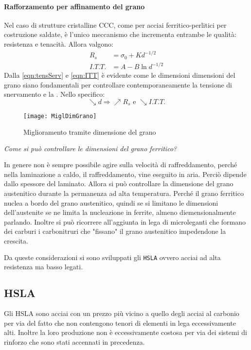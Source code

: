 \paragraph{Rafforzamento per affinamento del grano}
Nel caso di strutture cristalline CCC, come per acciai 
ferritico-perlitici per costruzione saldate, è l'unico meccanismo 
che incrementa entrambe le qualità: resistenza e tenacità.
Allora valgono:
\begin{align}
R_s &= \sigma_0 + K d^{-1/2} \label{eqn:tensServ}\\
I.T.T. &= A - B \ln d^{-1/2} \label{eqn:ITT}
\end{align}
Dalla \eqref{eqn:tensServ} e \eqref{eqn:ITT} è evidente come le 
dimensioni dimensioni del grano siano fondamentali per controllare
contemporaneamente la tensione di snervamento e la . Nello specifico:
\begin{equation}
\searrow d \Rightarrow \nearrow R_s \text{ e } \searrow I.T.T.
\label{eqn:RelMigli}
\end{equation}

\begin{figure}
\centering
\texttt{[image: MiglDimGrano]}
\caption{Miglioramento tramite dimensione del grano}
\label{fig:MiglDimGrano}
\end{figure}

\begin{center}
\emph{Come si può controllare le dimensioni del grano ferritico?}
\end{center}
In genere non è sempre possibile agire sulla velocità di raffreddamento, 
perché nella laminazione a caldo, il raffreddamento, vine eseguito in 
aria. Perciò dipende dallo spessore del laminato.
Allora si può controllare la dimensione del grano austenitico durante 
la permanenza ad alta temperatura.
Perché il grano ferritico nuclea a bordo del grano austenitico, quindi 
se si limitano le dimensioni dell'austenite se ne limita la nucleazione
in ferrite, almeno diemensionalmente parlando.
Inoltre si può ricorrere all'aggiunta in lega di microleganti
che formano dei carburi i carbonitruri che "fissano" il grano
austenitico impedendone la crescita.

Da queste considerazioni si sono sviluppati gli \texttt{HSLA} ovvero
acciai ad alta resistenza ma basso legati.

\subsection{HSLA}
Gli \ac{HSLA} sono acciai con un prezzo più vicino a quello degli acciai 
al carbonio per via del fatto che non contengono tenori di elementi in 
lega eccessivamente alti. Inoltre la loro produzione non è eccessivamente 
costosa per via dei sistemi di rinforzo che sono stati accennati in 
precedenza.

